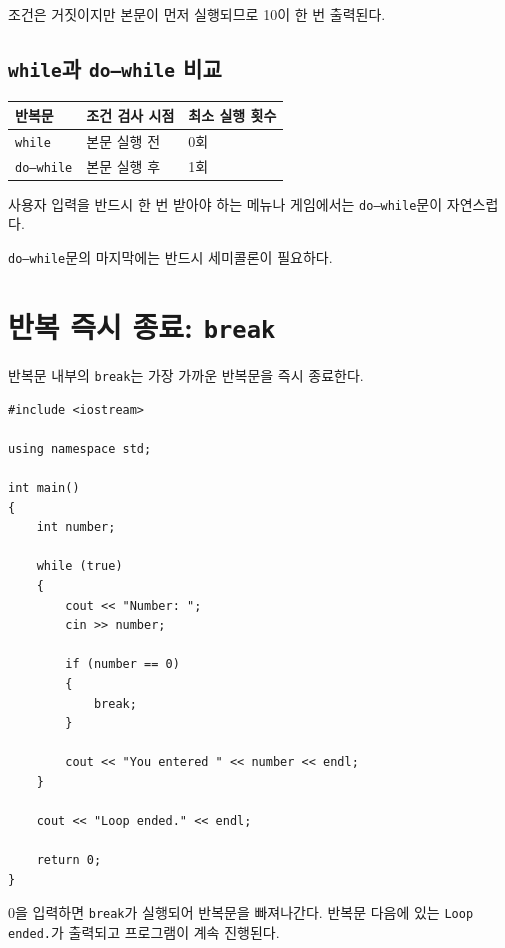 \documentclass[11pt,a4paper]{article}
\begin{document}
조건은 거짓이지만 본문이 먼저 실행되므로 10이 한 번 출력된다.

\subsection{\texttt{while}과 \texttt{do--while} 비교}

\begin{center}
\begin{tabular}{lll}
\toprule
반복문 & 조건 검사 시점 & 최소 실행 횟수 \\
\midrule
\texttt{while} & 본문 실행 전 & 0회 \\
\texttt{do--while} & 본문 실행 후 & 1회 \\
\bottomrule
\end{tabular}
\end{center}

사용자 입력을 반드시 한 번 받아야 하는 메뉴나 게임에서는
\texttt{do--while}문이 자연스럽다.

\begin{importantbox}
\texttt{do--while}문의 마지막에는 반드시 세미콜론이 필요하다.
\end{importantbox}

\section{반복 즉시 종료: \texttt{break}}

반복문 내부의 \texttt{break}는 가장 가까운 반복문을 즉시 종료한다.

\begin{lstlisting}
#include <iostream>

using namespace std;

int main()
{
    int number;

    while (true)
    {
        cout << "Number: ";
        cin >> number;

        if (number == 0)
        {
            break;
        }

        cout << "You entered " << number << endl;
    }

    cout << "Loop ended." << endl;

    return 0;
}
\end{lstlisting}

0을 입력하면 \texttt{break}가 실행되어 반복문을 빠져나간다.
반복문 다음에 있는 \texttt{Loop ended.}가 출력되고 프로그램이 계속 진행된다.
\end{document}
